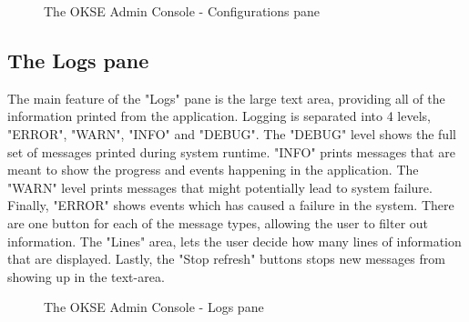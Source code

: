 \begin{center}
  \begin{figure}[ht!]
    \caption{The OKSE Admin Console - Configurations pane} 
    \label{fig:OKSE Admin Console - Configurations pane}
  \end{figure}
\end{center}

\subsection{The Logs pane}
The main feature of the "Logs" pane is the large text area, providing all of the information printed from the application. Logging is separated into 4 levels, "ERROR", "WARN", "INFO" and "DEBUG". The "DEBUG" level shows the full set of messages printed during system runtime. "INFO" prints messages that are meant to show the progress and events happening in the application. The "WARN" level prints messages that might potentially lead to system failure. Finally, "ERROR" shows events which has caused a failure in the system. There are one button for each of the message types, allowing the user to filter out information. The "Lines" area, lets the user decide how many lines of information that are displayed. Lastly, the "Stop refresh" buttons stops new messages from showing up in the text-area.

\begin{center}
  \begin{figure}[ht!]
    \caption{The OKSE Admin Console - Logs pane} 
    \label{fig:OKSE Admin Console - Logs pane}
  \end{figure}
\end{center}

